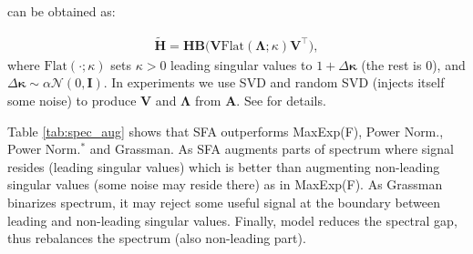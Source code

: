 \vspace{0.1cm}
 can be obtained as:

\vspace{-0.3cm}
\begin{equation}
\begin{aligned}
         \widetilde{\mathbf{H}} \!=\! \mathbf{H}\mathbf{B}\big(\mathbf{V}\text{Flat}(\mathbf{\Lambda}; \kappa)\mathbf{V}^\top\big),
    \end{aligned}
    \label{eq:grass}
\end{equation}
%
where $\text{Flat}(\cdot; \kappa)$ sets $\kappa\!>\!0$ leading singular values to $1+\Delta\boldsymbol{\kappa}$ (the rest is 0), and $\Delta\boldsymbol{\kappa}\!\sim\!\alpha\mathcal{N}(0,\mathbf{I})$. In experiments we use SVD and random SVD (injects itself some noise) to produce $\mathbf{V}$ and $\mathbf{\Lambda}$ from $\mathbf{A}$. See   for details.

Table \ref{tab:spec_aug} shows that SFA outperforms MaxExp(F), Power Norm., Power Norm.$^*$ and Grassman. As SFA  augments parts of spectrum where signal resides (leading singular values) which is better than  augmenting non-leading singular values  (some noise may reside there) as in MaxExp(F). As Grassman  binarizes spectrum, it may reject some useful signal at the boundary between leading and non-leading singular values. Finally,   model reduces the spectral gap, thus rebalances the spectrum (also non-leading part).




%      



